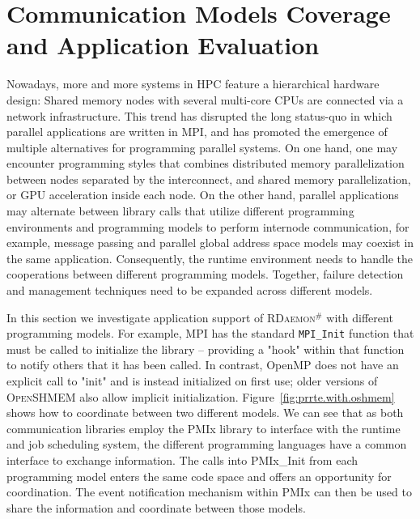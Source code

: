 \documentclass[5p,times,twocolumn]{elsarticle}
\newcommand{\mpifunc}[1]{\lstinline"MPI_#1"\xspace}
\newcommand{\mpi}[0]{\textsc{MPI}\xspace}
\newcommand{\oshmem}[0]{\textsc{OpenSHMEM}\xspace}
\newcommand{\ourwork}[0]{\textsc{RDaemon}\ensuremath{^\#}\xspace}
\begin{document}
\section{Communication Models Coverage and Application Evaluation}\label{sec:application}
Nowadays, more and more systems in HPC feature a hierarchical hardware design: Shared memory nodes
with several multi-core CPUs are connected via a network infrastructure. This trend has disrupted the long status-quo in which parallel applications are written in \mpi, and has promoted the emergence of multiple alternatives for programming parallel systems. 
On one hand, one may encounter programming styles that combines distributed memory parallelization between nodes separated by the interconnect, and shared memory parallelization, or GPU acceleration inside each node. On the other hand, parallel applications may alternate between 
library calls that utilize different programming environments and programming models 
to perform internode communication, for example, message passing and parallel global address space models may coexist in the same application. Consequently,
the runtime environment needs to handle the cooperations between different programming models. Together,
failure detection and management techniques need to be expanded across different models.

In this section we investigate application support of \ourwork with different programming models.
For example, \mpi has the standard \mpifunc{Init} function that must be called to initialize the
library – providing a "hook" within that function to notify others that it has been called.
In contrast, OpenMP does not have an explicit call to "init" and is instead initialized on first use; older versions of \oshmem also allow implicit initialization.
Figure~\ref{fig:prrte.with.oshmem} shows how to coordinate between two different models. We can see
that as both communication libraries employ the PMIx library to interface with the runtime and job scheduling system,
the different programming languages have a common interface to exchange information.
The calls into PMIx\_Init from each programming model enters the same code space and offers an opportunity for coordination.
The event notification mechanism within PMIx can then be used to share the information and coordinate between those models.
\end{document}
